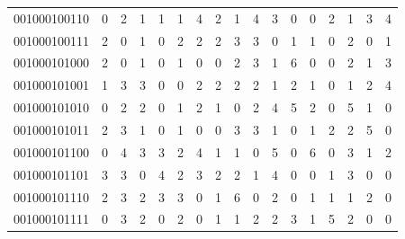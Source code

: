 \documentclass[10pt,a4paper]{article}
\begin{document}
\begin{longtable}{ |c|c|c|c|c|c|c|c|c|c|c|c|c|c|c|c|c| }
    001000100110              & 0                            & 2                                & 1                            & 1                              & 1   & 4   & 2   & 1   & 4   & 3   & 0   & 0   & 2   & 1   & 3   & 4   \\
    001000100111              & 2                            & 0                                & 1                            & 0                              & 2   & 2   & 2   & 3   & 3   & 0   & 1   & 1   & 0   & 2   & 0   & 1   \\
    001000101000              & 2                            & 0                                & 1                            & 0                              & 1   & 0   & 0   & 2   & 3   & 1   & 6   & 0   & 0   & 2   & 1   & 3   \\
    001000101001              & 1                            & 3                                & 3                            & 0                              & 0   & 2   & 2   & 2   & 2   & 1   & 2   & 1   & 0   & 1   & 2   & 4   \\
    001000101010              & 0                            & 2                                & 2                            & 0                              & 1   & 2   & 1   & 0   & 2   & 4   & 5   & 2   & 0   & 5   & 1   & 0   \\
    001000101011              & 2                            & 3                                & 1                            & 0                              & 1   & 0   & 0   & 3   & 3   & 1   & 0   & 1   & 2   & 2   & 5   & 0   \\
    001000101100              & 0                            & 4                                & 3                            & 3                              & 2   & 4   & 1   & 1   & 0   & 5   & 0   & 6   & 0   & 3   & 1   & 2   \\
    001000101101              & 3                            & 3                                & 0                            & 4                              & 2   & 3   & 2   & 2   & 1   & 4   & 0   & 0   & 1   & 3   & 0   & 0   \\
    001000101110              & 2                            & 3                                & 2                            & 3                              & 3   & 0   & 1   & 6   & 0   & 2   & 0   & 1   & 1   & 1   & 2   & 0   \\
    001000101111              & 0                            & 3                                & 2                            & 0                              & 2   & 0   & 1   & 1   & 2   & 2   & 3   & 1   & 5   & 2   & 0   & 0   \\

\end{longtable}
\end{document}
